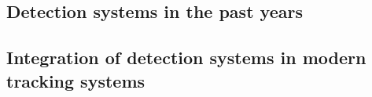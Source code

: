 \subsection{Detection systems in the past years}
\subsection{Integration of detection systems in modern tracking systems}
